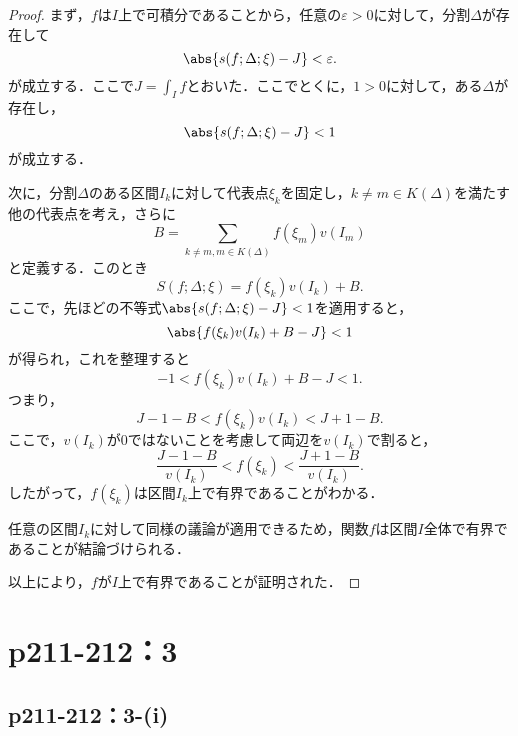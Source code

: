 \documentclass[a4paper,10pt,fleqn]{ltjsarticle}
\begin{document}
\begin{tleftbar}
	\begin{proof}
	まず，$f$は$I$上で可積分であることから，任意の$\varepsilon >0$に対して，分割$\Delta$が存在して
    \[
    \abs{s(f; \Delta; \xi) - J} < \varepsilon.
    \]
    が成立する．ここで$J = \int_I f$とおいた．ここでとくに，$1 >0$に対して，ある$\Delta$が存在し，
	\[
	\abs{ s(f; \Delta; \xi) - J } < 1
	\]
	が成立する．
	
	次に，分割$\Delta$のある区間$I_k$に対して代表点$\xi_k$を固定し，$k \ne m \in K(\Delta)$を満たす他の代表点を考え，さらに
	\[
	B = \sum_{k \ne m , m \in K(\Delta)} f(\xi_m) v(I_m)
	\]
	と定義する．このとき
	\[
	S(f; \Delta; \xi) = f(\xi_k) v(I_k) + B.
	\]
	ここで，先ほどの不等式$\abs{ s(f; \Delta; \xi) - J } < 1$を適用すると，
	\[
	\abs{ f(\xi_k) v(I_k) + B - J } < 1
	\]
	が得られ，これを整理すると
	\[
	-1 < f(\xi_k) v(I_k) + B - J < 1.
	\]
	つまり，
	\[
	J - 1 - B < f(\xi_k) v(I_k) < J + 1 - B.
	\]
	ここで，$v(I_k)$が$0$ではないことを考慮して両辺を$v(I_k)$で割ると，
	\[
	\frac{J - 1 - B}{v(I_k)} < f(\xi_k) < \frac{J + 1 - B}{v(I_k)}.
	\]
	したがって，$f(\xi_k)$は区間$I_k$上で有界であることがわかる．
	
	任意の区間$I_k$に対して同様の議論が適用できるため，関数$f$は区間$I$全体で有界であることが結論づけられる．
	
	以上により，$f$が$I$上で有界であることが証明された．
	\end{proof}
\end{tleftbar}


\section*{p211-212：3}


    \subsection*{p211-212：3-(i)}
\end{document}
